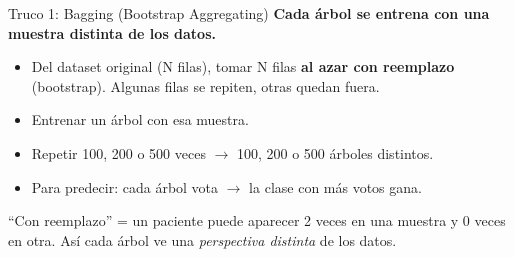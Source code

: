 \documentclass[aspectratio=169, 11pt]{beamer}
\begin{document}
\begin{frame}{Truco 1: Bagging (Bootstrap Aggregating)}
  \vspace{-4pt}
  {\footnotesize\color{arcaDark}\bfseries
    Cada árbol se entrena con una \textbf{muestra distinta} de los datos.}

  \vspace{6pt}
  {\footnotesize
  \begin{itemize}\setlength{\itemsep}{5pt}
    \item[{\color{arcaRed}\scriptsize\faArrowRight}]
      Del dataset original (N filas), tomar N filas \textbf{al azar
      con reemplazo} (bootstrap). Algunas filas se repiten, otras quedan fuera.
    \item[{\color{arcaRed}\scriptsize\faArrowRight}]
      Entrenar un árbol con esa muestra.
    \item[{\color{arcaRed}\scriptsize\faArrowRight}]
      Repetir 100, 200 o 500 veces $\to$ 100, 200 o 500 árboles distintos.
    \item[{\color{arcaRed}\scriptsize\faArrowRight}]
      Para predecir: cada árbol vota $\to$ la clase con más votos gana.
  \end{itemize}
  }

  \vspace{6pt}
  {\scriptsize\color{textMuted}
    \faLightbulb\hspace{4pt} ``Con reemplazo'' = un paciente puede
    aparecer 2 veces en una muestra y 0 veces en otra. Así cada árbol
    ve una \textit{perspectiva distinta} de los datos.}
\end{frame}
\end{document}
